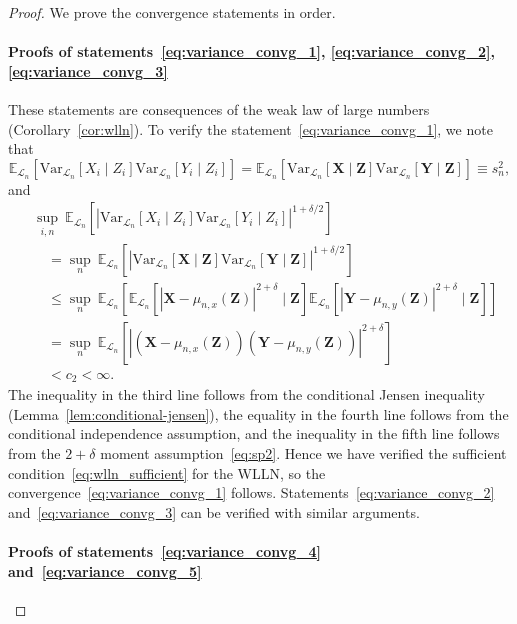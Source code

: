 \documentclass[aos]{imsart}
\theoremstyle{definition}
\theoremstyle{remark}
\newcommand{\E}{\mathbb E}								%
\newcommand{\V}{\mathrm{Var}}							%
\newcommand{\prx}{\bm X}								%
\newcommand{\srx}{X}									%
\newcommand{\prz}{\bm Z}								%
\newcommand{\srz}{Z}									%
\newcommand{\pry}{{\bm Y}}								%
\newcommand{\sry}{Y}									%
\newcommand{\law}{\mathcal L}							%
\begin{document}
\begin{proof}
	
	We prove the convergence statements in order.
	
	\paragraph*{Proofs of statements~\eqref{eq:variance_convg_1}, \eqref{eq:variance_convg_2}, \eqref{eq:variance_convg_3}}
	
	These statements are consequences of the weak law of large numbers (Corollary~\ref{cor:wlln}). To verify the statement~\eqref{eq:variance_convg_1}, we note that
	\begin{equation*}
		\E_{\law_n}[\V_{\law_n}[\srx_i\mid \srz_i]\V_{\law_n}[\sry_i \mid \srz_i]] = \E_{\law_n}[\V_{\law_n}[\prx\mid \prz]\V_{\law_n}[\pry \mid \prz]] \equiv s^2_n, 
	\end{equation*}
	and
	\begin{equation}
		\begin{split}
			&\sup_{i,n} \ \E_{\law_n}[|\V_{\law_n}[\srx_i\mid \srz_i]\V_{\law_n}[\sry_i \mid \srz_i]|^{1+\delta/2}] \\
			&\quad= \sup_n\ \E_{\law_n}[|\V_{\law_n}[\prx\mid \prz]\V_{\law_n}[\pry \mid \prz]|^{1+\delta/2}] \\
			&\quad\leq \sup_n\ \E_{\law_n}[\E_{\law_n}[|\prx - \mu_{n,x}(\prz)|^{2+\delta} \mid \prz]\E_{\law_n}[|\pry - \mu_{n,y}(\prz)|^{2+\delta} \mid \prz]] \\
			&\quad= \sup_n\ \E_{\law_n}[|(\prx - \mu_{n,x}(\prz))(\pry - \mu_{n,y}(\prz))|^{2 + \delta}] \\
			&\quad< c_2 < \infty.
		\end{split}
		\label{eq:variance-bound-derivation}
	\end{equation}
	The inequality in the third line follows from the conditional Jensen inequality (Lemma~\ref{lem:conditional-jensen}), the equality in the fourth line follows from the conditional independence assumption, and the inequality in the fifth line follows from the $2+\delta$ moment assumption~\eqref{eq:sp2}. Hence we have verified the sufficient condition~\eqref{eq:wlln_sufficient} for the WLLN, so the convergence~\eqref{eq:variance_convg_1} follows. Statements~\eqref{eq:variance_convg_2} and~\eqref{eq:variance_convg_3} can be verified with similar arguments.
	
	\paragraph*{Proofs of statements~\eqref{eq:variance_convg_4} and~\eqref{eq:variance_convg_5}} 
	

\end{proof}
\end{document}
